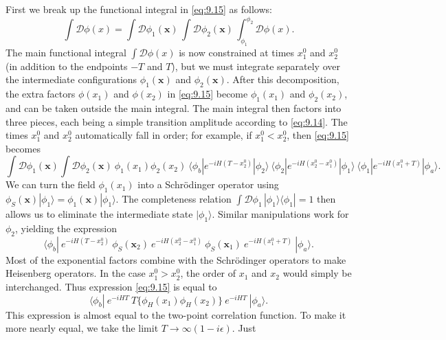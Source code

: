 First we break up the functional integral in \eqref{eq:9.15} as follows:
\begin{equation}
  \int \mathcal{D}\phi(x) = \int \mathcal{D}\phi_1(\mathbf{x})\,
    \int \mathcal{D}\phi_2(\mathbf{x})\, \int_{\phi_1}^{\phi_2}
    \mathcal{D}\phi(x) .
  \label{eq:9.16}
\end{equation}
The main functional integral $\int\mathcal{D}\phi(x)$ is now constrained at
times $x^0_1$ and $x^0_2$ (in addition to the endpoints $-T$ and $T$), but we
must integrate separately over the intermediate configurations
$\phi_1(\mathbf{x})$ and $\phi_2(\mathbf{x})$.  After this decomposition, the
extra factors $\phi(x_1)$ and $\phi(x_2)$ in \eqref{eq:9.15} become
$\phi_1(x_1)$ and $\phi_2(x_2)$, and can be taken outside the main integral.
The main integral then factors into three pieces, each being a simple
transition amplitude according to \eqref{eq:9.14}.  The times $x^0_1$ and
$x^0_2$ automatically fall in order; for example, if $x^0_1 < x^0_2$, then
\eqref{eq:9.15} becomes
\begin{equation}
  \int \mathcal{D}\phi_1(\mathbf{x})\int \mathcal{D}\phi_2(\mathbf{x})\
    \phi_1(x_1)\phi_2(x_2)\ \langle \phi_b|e^{-iH(T-x^0_2)}|\phi_2\rangle\
    \langle \phi_2|e^{-iH(x^0_2-x^0_1)}|\phi_1\rangle\
    \langle \phi_1|e^{-iH(x^0_1+T)}|\phi_a\rangle .
\end{equation}
We can turn the field $\phi_1(x_1)$ into a Schr\"odinger operator using
$\phi_S(\mathbf{x})|\phi_1\rangle = \phi_1(\mathbf{x})|\phi_1\rangle$.  The
completeness relation $\int\mathcal{D}\phi_1\,|\phi_1\rangle\langle\phi_1| = 1$
then allows us to eliminate the intermediate state $|\phi_1\rangle$.  Similar
manipulations work for $\phi_2$, yielding the expression
\begin{equation}
  \langle \phi_b|\ e^{-iH(T-x^0_2)}\ \phi_S(\mathbf{x}_2)\
    e^{-iH(x^0_2-x^0_1)}\ \phi_S(\mathbf{x}_1)\
    e^{-iH(x^0_1+T)}\ |\phi_a\rangle .
\end{equation}
Most of the exponential factors combine with the Schr\"odinger operators to
make Heisenberg operators.  In the case $x^0_1 > x^0_2$, the order of $x_1$ and
$x_2$ would simply be interchanged.  Thus expression \eqref{eq:9.15} is equal
to
\begin{equation}
  \langle \phi_b|\ e^{-iHT}\ T\{\phi_H(x_1)\phi_H(x_2)\}\ e^{-iHT}\
    |\phi_a\rangle .
  \label{eq:9.17}
\end{equation}
This expression is almost equal to the two-point correlation function.  To
make it more nearly equal, we take the limit $T\to\infty(1-i\epsilon)$.  Just
